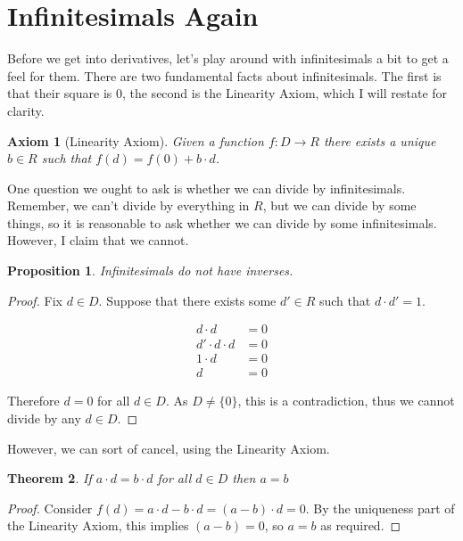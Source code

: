\documentclass[]{book}
\newtheorem{thm}{Theorem}
\newtheorem{prop}[thm]{Proposition}
\newtheorem{ax}{Axiom}
\begin{document}
\section{Infinitesimals Again}

Before we get into derivatives, let's play around with infinitesimals a bit to get a feel for them. There are two fundamental facts about infinitesimals. The first is that their square is 0, the second is the Linearity Axiom, which I will restate for clarity.

\begin{ax}[Linearity Axiom]
  Given a function $f : D \to R$ there exists a unique $b \in R$ such that $f(d) = f(0) + b \cdot d$.
\end{ax}

One question we ought to ask is whether we can divide by infinitesimals. Remember, we can't divide by everything in $R$, but we can divide by some things, so it is reasonable to ask whether we can divide by some infinitesimals. However, I claim that we cannot.

\begin{prop}
  Infinitesimals do not have inverses.
\end{prop}
\begin{proof}
  Fix $d \in D$. Suppose that there exists some $d' \in R$ such that $d \cdot d' = 1$.

  \begin{align*}
    d \cdot d &= 0 \\
    d' \cdot d \cdot d &= 0 \\
    1 \cdot d &= 0 \\
    d &= 0
  \end{align*}

  Therefore $d = 0$ for all $d \in D$. As $D \neq \{0\}$, this is a contradiction, thus we cannot divide by any $d \in D$.
\end{proof}

However, we can sort of cancel, using the Linearity Axiom.

\begin{thm}
  \label{cancellation}
  If $a \cdot d = b \cdot d$ for all $d \in D$ then $a = b$
\end{thm}
\begin{proof}
  Consider $f(d) = a \cdot d - b \cdot d = (a - b) \cdot d = 0$. By the uniqueness part of the Linearity Axiom, this implies $(a - b) = 0$, so $a = b$ as required.
\end{proof}
\end{document}
